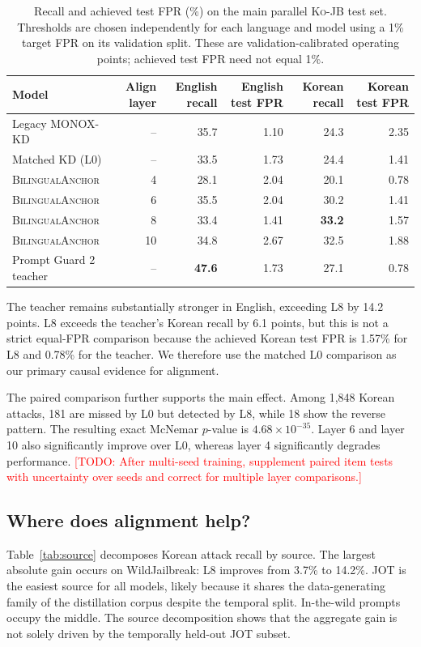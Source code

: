 \documentclass[10pt,twocolumn]{article}
\newcommand{\method}{\textsc{BilingualAnchor}}
\newcommand{\todo}[1]{\textcolor{red}{[TODO: #1]}}
\newcommand{\dataset}{\textsc{Ko-JB}}
\begin{document}
\begin{table}[t]
\centering
\small
\begin{tabular}{lrrrrr}
\toprule
Model & Align layer & English recall & English test FPR & Korean recall & Korean test FPR \\
\midrule
Legacy MONOX-KD & -- & 35.7 & 1.10 & 24.3 & 2.35 \\
Matched KD (L0) & -- & 33.5 & 1.73 & 24.4 & 1.41 \\
\method{} & 4 & 28.1 & 2.04 & 20.1 & 0.78 \\
\method{} & 6 & 35.5 & 2.04 & 30.2 & 1.41 \\
\method{} & 8 & 33.4 & 1.41 & \textbf{33.2} & 1.57 \\
\method{} & 10 & 34.8 & 2.67 & 32.5 & 1.88 \\
Prompt Guard 2 teacher & -- & \textbf{47.6} & 1.73 & 27.1 & 0.78 \\
\bottomrule
\end{tabular}
\caption{Recall and achieved test FPR (\%) on the main parallel \dataset{} test
set. Thresholds are chosen independently for each language and model using a
1\% target FPR on its validation split. These are validation-calibrated
operating points; achieved test FPR need not equal 1\%.}
\label{tab:main}
\end{table}

The teacher remains substantially stronger in English, exceeding L8 by 14.2
points. L8 exceeds the teacher's Korean recall by 6.1 points, but this is not a
strict equal-FPR comparison because the achieved Korean test FPR is 1.57\% for
L8 and 0.78\% for the teacher. We therefore use the matched L0 comparison as our
primary causal evidence for alignment.

The paired comparison further supports the main effect. Among 1,848 Korean
attacks, 181 are missed by L0 but detected by L8, while 18 show the reverse
pattern. The resulting exact McNemar $p$-value is $4.68\times 10^{-35}$.
Layer 6 and layer 10 also significantly improve over L0, whereas layer 4
significantly degrades performance. \todo{After multi-seed training, supplement
paired item tests with uncertainty over seeds and correct for multiple layer
comparisons.}

\subsection{Where does alignment help?}

Table~\ref{tab:source} decomposes Korean attack recall by source. The largest
absolute gain occurs on WildJailbreak: L8 improves from 3.7\% to 14.2\%. JOT is
the easiest source for all models, likely because it shares the data-generating
family of the distillation corpus despite the temporal split. In-the-wild
prompts occupy the middle. The source decomposition shows that the aggregate
gain is not solely driven by the temporally held-out JOT subset.
\end{document}
